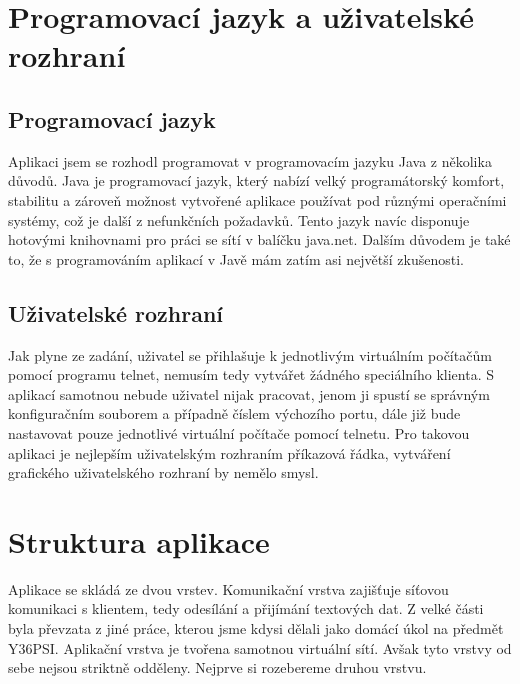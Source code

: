 
\section{Programovací jazyk a uživatelské rozhraní}

\subsection{Programovací jazyk}
Aplikaci jsem se rozhodl programovat v programovacím jazyku Java z několika důvodů. Java je programovací jazyk, který nabízí velký programátorský komfort, stabilitu a zároveň možnost vytvořené aplikace používat pod různými operačními systémy, což je další z nefunkčních požadavků. Tento jazyk navíc disponuje hotovými knihovnami pro práci se sítí v balíčku java.net. Dalším důvodem je také to, že s programováním aplikací v Javě mám zatím asi největší zkušenosti.

\subsection{Uživatelské rozhraní}

Jak plyne ze zadání, uživatel se přihlašuje k jednotlivým virtuálním počítačům pomocí programu telnet, nemusím tedy vytvářet žádného speciálního klienta. S aplikací samotnou nebude uživatel nijak pracovat, jenom ji spustí se správným konfiguračním souborem a případně číslem výchozího portu, dále již bude nastavovat pouze jednotlivé virtuální počítače pomocí telnetu. Pro takovou aplikaci je nejlepším uživatelským rozhraním příkazová řádka, vytváření grafického uživatelského rozhraní by nemělo smysl.


\section{Struktura aplikace}
Aplikace se skládá ze dvou vrstev. Komunikační vrstva zajišťuje síťovou komunikaci s klientem, tedy odesílání a přijímání textových dat. Z velké části byla převzata z jiné práce, kterou jsme kdysi dělali jako domácí úkol na předmět Y36PSI. Aplikační vrstva je tvořena samotnou virtuální sítí. Avšak tyto vrstvy od sebe nejsou striktně odděleny. Nejprve si rozebereme druhou vrstvu.

